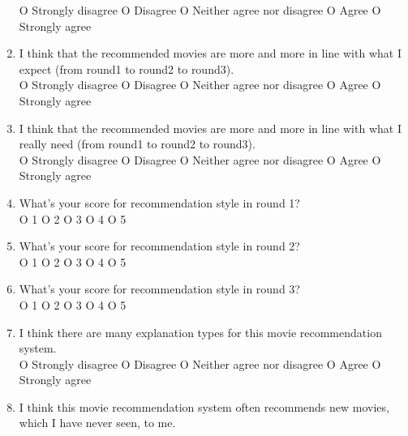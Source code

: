 \begin{enumerate}
O Strongly disagree O Disagree O Neither agree nor disagree O Agree O Strongly agree

\item I think that the recommended movies are more and more in line with what I expect (from round1 to round2 to round3).\\

O Strongly disagree O Disagree O Neither agree nor disagree O Agree O Strongly agree

\item I think that the recommended movies are more and more in line with what I really need (from round1 to round2 to round3).\\

O Strongly disagree O Disagree O Neither agree nor disagree O Agree O Strongly agree

\item What's your score for recommendation style in round 1?\\

O 1 \hspace{2cm}O 2 \hspace{2cm}O 3 \hspace{2cm}O 4 \hspace{2cm}O 5

\item What's your score for recommendation style in round 2?\\

O 1 \hspace{2cm}O 2 \hspace{2cm}O 3 \hspace{2cm}O 4 \hspace{2cm}O 5

\item What's your score for recommendation style in round 3?\\

O 1 \hspace{2cm}O 2 \hspace{2cm}O 3 \hspace{2cm}O 4 \hspace{2cm}O 5

\item I think there are many explanation types for this movie recommendation system.\\

O Strongly disagree O Disagree O Neither agree nor disagree O Agree O Strongly agree

\item I think this movie recommendation system often recommends new movies, which I have never seen, to me.\\


\end{enumerate}
